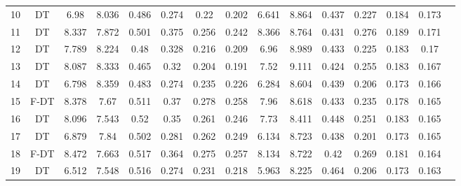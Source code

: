 \begin{longtable}{@{\hskip3pt}c@{\hskip3pt}c@{\hskip3pt}c@{\hskip3pt}c@{\hskip3pt}c@{\hskip3pt}c@{\hskip3pt}c@{\hskip3pt}c@{\hskip3pt}c@{\hskip3pt}c@{\hskip3pt}c@{\hskip3pt}c@{\hskip3pt}c@{\hskip3pt}c@{\hskip3pt}c}
         10 &             DT &              6.98 &       8.036 &           0.486 &           0.274 &            0.22 &           0.202 &               6.641 &       8.864 &           0.437 &         0.227 &          0.184 &           0.173 \\
         11 &             DT &             8.337 &       7.872 &           0.501 &           0.375 &           0.256 &           0.242 &               8.366 &       8.764 &           0.431 &         0.276 &          0.189 &           0.171 \\
         12 &             DT &             7.789 &       8.224 &            0.48 &           0.328 &           0.216 &           0.209 &                6.96 &       8.989 &           0.433 &         0.225 &          0.183 &            0.17 \\
         13 &             DT &             8.087 &       8.333 &           0.465 &            0.32 &           0.204 &           0.191 &                7.52 &       9.111 &           0.424 &         0.255 &          0.183 &           0.167 \\
         14 &             DT &             6.798 &       8.359 &           0.483 &           0.274 &           0.235 &           0.226 &               6.284 &       8.604 &           0.439 &         0.206 &          0.173 &           0.166 \\
         15 &           F-DT &             8.378 &        7.67 &           0.511 &            0.37 &           0.278 &           0.258 &                7.96 &       8.618 &           0.433 &         0.235 &          0.178 &           0.165 \\
         16 &             DT &             8.096 &       7.543 &            0.52 &            0.35 &           0.261 &           0.246 &                7.73 &       8.411 &           0.448 &         0.251 &          0.183 &           0.165 \\
         17 &             DT &             6.879 &        7.84 &           0.502 &           0.281 &           0.262 &           0.249 &               6.134 &       8.723 &           0.438 &         0.201 &          0.173 &           0.165 \\
         18 &           F-DT &             8.472 &       7.663 &           0.517 &           0.364 &           0.275 &           0.257 &               8.134 &       8.722 &            0.42 &         0.269 &          0.181 &           0.164 \\
         19 &             DT &             6.512 &       7.548 &           0.516 &           0.274 &           0.231 &           0.218 &               5.963 &       8.225 &           0.464 &         0.206 &          0.173 &           0.163 \\

\end{longtable}
